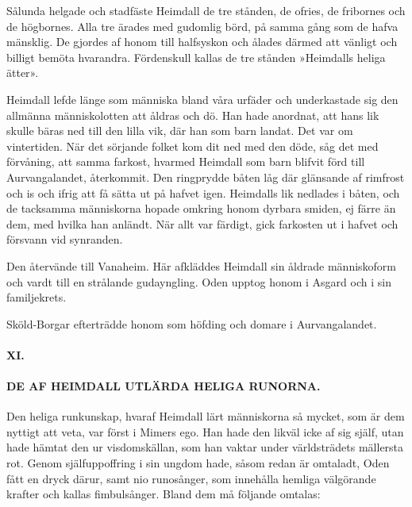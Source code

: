 Sålunda helgade och stadfäste Heimdall de tre stånden, de ofries, de
fribornes och de högbornes. Alla tre ärades med gudomlig börd, på samma
gång som de hafva mänsklig. De gjordes af honom till halfsyskon och
ålades därmed att vänligt och billigt bemöta hvarandra. Fördenskull
kallas de tre stånden »Heimdalls heliga ätter».

\protect\hypertarget{lb1625905.xhtmlux5cux23start23}{}{}\protect\hypertarget{lb1625905.xhtmlux5cux23start23-a}{}{}\protect\hypertarget{lb1625905.xhtmlux5cux23start23-b}{}{}\protect\hypertarget{lb1625905.xhtmlux5cux23start23-c}{}{}\protect\hypertarget{lb1625905.xhtmlux5cux23start23-d}{}{}

Heimdall lefde länge som människa bland våra urfäder och underkastade
sig den allmänna människolotten att åldras och dö. Han hade anordnat,
att hans lik skulle bäras ned till den lilla vik, där han som barn
landat. Det var om vintertiden. När det sörjande folket kom dit ned med
den döde, såg det med förvåning, att samma farkost, hvarmed Heimdall som
barn blifvit förd till Aurvangalandet, återkommit. Den ringprydde båten
låg där glänsande af rimfrost och is och ifrig att få sätta ut på hafvet
igen. Heimdalls lik nedlades i båten, och de tacksamma människorna
hopade omkring honom dyrbara smiden, ej färre än dem, med hvilka han
anländt. När allt var färdigt, gick farkosten ut i hafvet och försvann
vid synranden.

Den återvände till Vanaheim. Här afkläddes Heimdall sin åldrade
människoform och vardt till en strålande gudayngling. Oden upptog honom
i Asgard och i sin familjekrets.

Sköld-Borgar efterträdde honom som höfding och domare i Aurvangalandet.

\paragraph{XI.}

\paragraph{DE AF HEIMDALL UTLÄRDA HELIGA RUNORNA.}

Den heliga runkunskap, hvaraf Heimdall lärt människorna så mycket, som
är dem nyttigt att veta, var först i Mimers ego. Han hade den likväl
icke af sig själf, utan hade hämtat den ur visdomskällan, som han vaktar
under världsträdets mällersta rot. Genom själfuppoffring i sin ungdom
hade, såsom redan är omtaladt, Oden fått en dryck därur, samt nio
runosånger, som innehålla hemliga välgörande krafter och kallas
fimbulsånger. Bland dem må följande omtalas:


